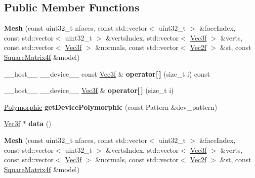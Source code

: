 \subsection*{Public Member Functions}
\begin{DoxyCompactItemize}
\item 
{\bfseries Mesh} (const uint32\+\_\+t nfaces, const std\+::vector$<$ uint32\+\_\+t $>$ \&face\+Index, const std\+::vector$<$ uint32\+\_\+t $>$ \&verts\+Index, std\+::vector$<$ \hyperlink{class_vec3}{Vec3f} $>$ \&verts, const std\+::vector$<$ \hyperlink{class_vec3}{Vec3f} $>$ \&normals, const std\+::vector$<$ \hyperlink{class_vec2}{Vec2f} $>$ \&st, const \hyperlink{class_square_matrix4}{Square\+Matrix4f} \&model)\hypertarget{class_mesh_ae66d189c5755899fc40c0a6f33a28781}{}\label{class_mesh_ae66d189c5755899fc40c0a6f33a28781}

\item 
\+\_\+\+\_\+host\+\_\+\+\_\+ \+\_\+\+\_\+device\+\_\+\+\_\+ const \hyperlink{class_vec3}{Vec3f} \& {\bfseries operator\mbox{[}$\,$\mbox{]}} (size\+\_\+t i) const\hypertarget{class_mesh_abe7a4a30b9a82dd71164071d0f398ab8}{}\label{class_mesh_abe7a4a30b9a82dd71164071d0f398ab8}

\item 
\+\_\+\+\_\+host\+\_\+\+\_\+ \+\_\+\+\_\+device\+\_\+\+\_\+ \hyperlink{class_vec3}{Vec3f} \& {\bfseries operator\mbox{[}$\,$\mbox{]}} (size\+\_\+t i)\hypertarget{class_mesh_ad97c062c97725555f13cec4c9c00448f}{}\label{class_mesh_ad97c062c97725555f13cec4c9c00448f}

\item 
\hyperlink{struct_polymorphic}{Polymorphic} {\bfseries get\+Device\+Polymorphic} (const Pattern \&dev\+\_\+pattern)\hypertarget{class_mesh_a5a6b65787f239cffc60fbf955473b129}{}\label{class_mesh_a5a6b65787f239cffc60fbf955473b129}

\item 
\hyperlink{class_vec3}{Vec3f} $\ast$ {\bfseries data} ()\hypertarget{class_mesh_a827769cc062165859fc51581e14d64d8}{}\label{class_mesh_a827769cc062165859fc51581e14d64d8}

\item 
{\bfseries Mesh} (const uint32\+\_\+t nfaces, const std\+::vector$<$ uint32\+\_\+t $>$ \&face\+Index, const std\+::vector$<$ uint32\+\_\+t $>$ \&verts\+Index, std\+::vector$<$ \hyperlink{class_vec3}{Vec3f} $>$ \&verts, const std\+::vector$<$ \hyperlink{class_vec3}{Vec3f} $>$ \&normals, const std\+::vector$<$ \hyperlink{class_vec2}{Vec2f} $>$ \&st, const \hyperlink{class_square_matrix4}{Square\+Matrix4f} \&model)\hypertarget{class_mesh_ae66d189c5755899fc40c0a6f33a28781}{}\label{class_mesh_ae66d189c5755899fc40c0a6f33a28781}


\end{DoxyCompactItemize}
